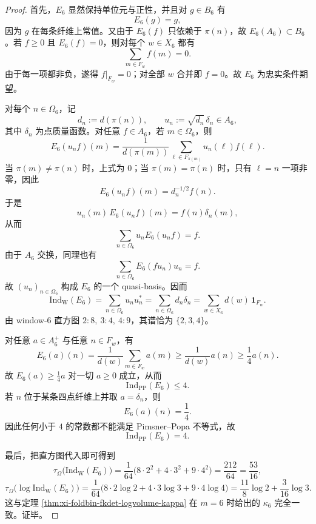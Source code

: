 \begin{proof}
首先，\(E_6\) 显然保持单位元与正性，并且对 \(g\in B_6\) 有
\[
E_6(g)=g,
\]
因为 \(g\) 在每条纤维上常值。又由于 \(E_6(f)\) 只依赖于 \(\pi(n)\)，故 \(E_6(A_6)\subset B_6\)。若 \(f\ge 0\) 且 \(E_6(f)=0\)，则对每个 \(w\in X_6\) 都有
\[
\sum_{m\in F_w}f(m)=0.
\]
由于每一项都非负，遂得 \(f|_{F_w}=0\)；对全部 \(w\) 合并即 \(f=0\)。故 \(E_6\) 为忠实条件期望。

对每个 \(n\in \Omega_6\)，记
\[
d_n:=d(\pi(n)),
\qquad
u_n:=\sqrt{d_n}\,\delta_n\in A_6,
\]
其中 \(\delta_n\) 为点质量函数。对任意 \(f\in A_6\)，若 \(m\in \Omega_6\)，则
\[
E_6(u_nf)(m)
=
\frac{1}{d(\pi(m))}
\sum_{\ell\in F_{\pi(m)}}u_n(\ell)f(\ell).
\]
当 \(\pi(m)\neq \pi(n)\) 时，上式为 \(0\)；当 \(\pi(m)=\pi(n)\) 时，只有 \(\ell=n\) 一项非零，因此
\[
E_6(u_nf)(m)=d_n^{-1/2}f(n).
\]
于是
\[
u_n(m)\,E_6(u_nf)(m)=f(n)\delta_n(m),
\]
从而
\[
\sum_{n\in\Omega_6}u_nE_6(u_nf)=f.
\]
由于 \(A_6\) 交换，同理也有
\[
\sum_{n\in\Omega_6}E_6(fu_n)u_n=f.
\]
故 \((u_n)_{n\in\Omega_6}\) 构成 \(E_6\) 的一个 quasi-basis。因而
\[
\mathrm{Ind}_{\mathrm W}(E_6)
=
\sum_{n\in\Omega_6}u_nu_n^\ast
=
\sum_{n\in\Omega_6}d_n\delta_n
=
\sum_{w\in X_6}d(w)\,\mathbf 1_{F_w}.
\]
由 window-\(6\) 直方图 \(2:8,\ 3:4,\ 4:9\)，其谱恰为 \(\{2,3,4\}\)。

对任意 \(a\in A_6^+\) 与任意 \(n\in F_w\)，有
\[
E_6(a)(n)
=
\frac{1}{d(w)}\sum_{m\in F_w}a(m)
\ge
\frac{1}{d(w)}a(n)
\ge
\frac14 a(n).
\]
故 \(E_6(a)\ge \frac14 a\) 对一切 \(a\ge 0\) 成立，从而
\[
\mathrm{Ind}_{\mathrm{PP}}(E_6)\le 4.
\]
若 \(n\) 位于某条四点纤维上并取 \(a=\delta_n\)，则
\[
E_6(a)(n)=\frac14.
\]
因此任何小于 \(4\) 的常数都不能满足 Pimsner--Popa 不等式，故
\[
\mathrm{Ind}_{\mathrm{PP}}(E_6)=4.
\]

最后，把直方图代入即可得到
\[
\tau_\Omega\!\bigl(\mathrm{Ind}_{\mathrm W}(E_6)\bigr)
=
\frac{1}{64}\bigl(8\cdot 2^2+4\cdot 3^2+9\cdot 4^2\bigr)
=
\frac{212}{64}
=
\frac{53}{16},
\]
\[
\tau_\Omega\!\bigl(\log \mathrm{Ind}_{\mathrm W}(E_6)\bigr)
=
\frac{1}{64}\bigl(8\cdot 2\log 2+4\cdot 3\log 3+9\cdot 4\log 4\bigr)
=
\frac{11}{8}\log 2+\frac{3}{16}\log 3.
\]
这与定理 \ref{thm:xi-foldbin-fkdet-logvolume-kappa} 在 \(m=6\) 时给出的 \(\kappa_6\) 完全一致。证毕。
\end{proof}

